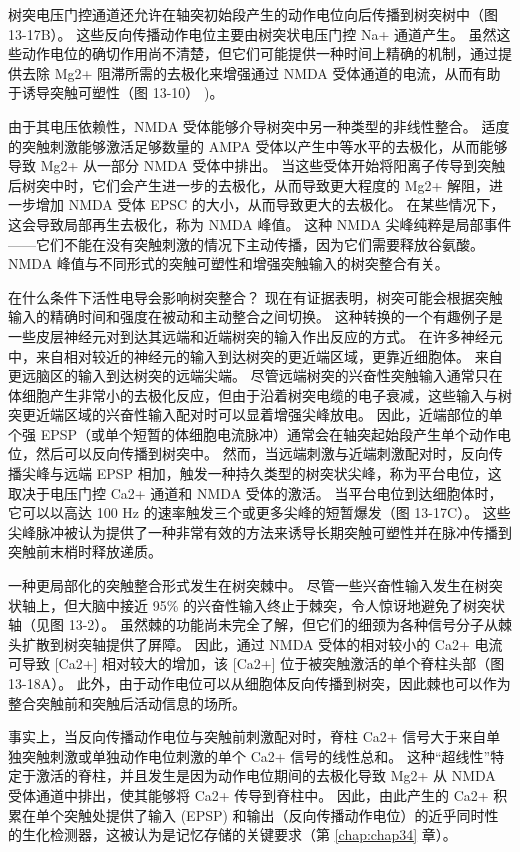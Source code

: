 树突电压门控通道还允许在轴突初始段产生的动作电位向后传播到树突树中（图 13-17B）。 
这些反向传播动作电位主要由树突状电压门控 Na+ 通道产生。 
虽然这些动作电位的确切作用尚不清楚，但它们可能提供一种时间上精确的机制，通过提供去除 Mg2+ 阻滞所需的去极化来增强通过 NMDA 受体通道的电流，从而有助于诱导突触可塑性（图 13-10） )。


由于其电压依赖性，NMDA 受体能够介导树突中另一种类型的非线性整合。 
适度的突触刺激能够激活足够数量的 AMPA 受体以产生中等水平的去极化，从而能够导致 Mg2+ 从一部分 NMDA 受体中排出。
当这些受体开始将阳离子传导到突触后树突中时，它们会产生进一步的去极化，从而导致更大程度的 Mg2+ 解阻，进一步增加 NMDA 受体 EPSC 的大小，从而导致更大的去极化。 
在某些情况下，这会导致局部再生去极化，称为 NMDA 峰值。 
这种 NMDA 尖峰纯粹是局部事件——它们不能在没有突触刺激的情况下主动传播，因为它们需要释放谷氨酸。 
NMDA 峰值与不同形式的突触可塑性和增强突触输入的树突整合有关。


在什么条件下活性电导会影响树突整合？
现在有证据表明，树突可能会根据突触输入的精确时间和强度在被动和主动整合之间切换。
这种转换的一个有趣例子是一些皮层神经元对到达其远端和近端树突的输入作出反应的方式。
在许多神经元中，来自相对较近的神经元的输入到达树突的更近端区域，更靠近细胞体。
来自更远脑区的输入到达树突的远端尖端。
尽管远端树突的兴奋性突触输入通常只在体细胞产生非常小的去极化反应，但由于沿着树突电缆的电子衰减，这些输入与树突更近端区域的兴奋性输入配对时可以显着增强尖峰放电。
因此，近端部位的单个强 EPSP（或单个短暂的体细胞电流脉冲）通常会在轴突起始段产生单个动作电位，然后可以反向传播到树突中。
然而，当远端刺激与近端刺激配对时，反向传播尖峰与远端 EPSP 相加，触发一种持久类型的树突状尖峰，称为平台电位，这取决于电压门控 Ca2+ 通道和 NMDA 受体的激活。
当平台电位到达细胞体时，它可以以高达 100 Hz 的速率触发三个或更多尖峰的短暂爆发（图 13-17C）。
这些尖峰脉冲被认为提供了一种非常有效的方法来诱导长期突触可塑性并在脉冲传播到突触前末梢时释放递质。


一种更局部化的突触整合形式发生在树突棘中。
尽管一些兴奋性输入发生在树突状轴上，但大脑中接近 95\% 的兴奋性输入终止于棘突，令人惊讶地避免了树突状轴（见图 13-2）。
虽然棘的功能尚未完全了解，但它们的细颈为各种信号分子从棘头扩散到树突轴提供了屏障。
因此，通过 NMDA 受体的相对较小的 Ca2+ 电流可导致 [Ca2+] 相对较大的增加，该 [Ca2+] 位于被突触激活的单个脊柱头部（图 13-18A）。
此外，由于动作电位可以从细胞体反向传播到树突，因此棘也可以作为整合突触前和突触后活动信息的场所。


事实上，当反向传播动作电位与突触前刺激配对时，脊柱 Ca2+ 信号大于来自单独突触刺激或单独动作电位刺激的单个 Ca2+ 信号的线性总和。
这种“超线性”特定于激活的脊柱，并且发生是因为动作电位期间的去极化导致 Mg2+ 从 NMDA 受体通道中排出，使其能够将 Ca2+ 传导到脊柱中。
因此，由此产生的 Ca2+ 积累在单个突触处提供了输入 (EPSP) 和输出（反向传播动作电位）的近乎同时性的生化检测器，这被认为是记忆存储的关键要求（第 \ref{chap:chap34} 章）。


